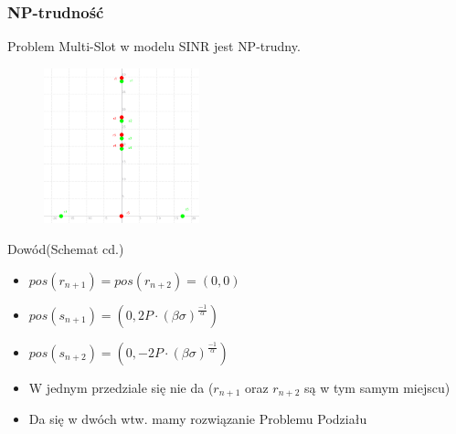 \documentclass[polish, t,10pt]{beamer}
\begin{document}
\begin{frame}
    \frametitle{NP-trudność}
    \begin{theorem}
        Problem Multi-Slot w modelu SINR jest NP-trudny.
    \end{theorem}
    \begin{figure}
        \includegraphics[width=0.4\textwidth]{pictures/np-placement2.png}
    \end{figure}
    \begin{block}{Dowód(Schemat cd.)}
        \begin{itemize}
            \item $pos(r_{n+1}) = pos(r_{n+2}) = (0, 0)$
            \item $pos(s_{n+1}) = (0, 2P\cdot(\beta\sigma)^{\frac{-1}{\alpha}})$
            \item $pos(s_{n+2}) = (0, -2P\cdot(\beta\sigma)^{\frac{-1}{\alpha}})$
            \item W jednym przedziale się nie da ($r_{n+1}$ oraz $r_{n+2}$ są w tym samym miejscu)
            \item Da się w dwóch wtw. mamy rozwiązanie Problemu Podziału
        \end{itemize}
    \end{block}
\end{frame}
\end{document}
